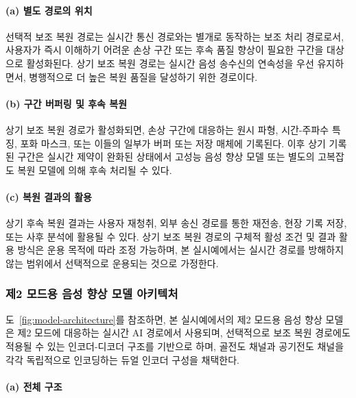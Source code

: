 \documentclass{article}
\DeclareRobustCommand{\codexedit}[1]{\textcolor{customorange}{#1}}
\begin{document}
\paragraph{(a) 별도 경로의 위치}

선택적 보조 복원 경로는 실시간 통신 경로와는 별개로 동작하는 보조 처리 경로로서, 사용자가 즉시 이해하기 어려운 손상 구간 또는 후속 품질 향상이 필요한 구간을 대상으로 활성화된다. 상기 보조 복원 경로는 실시간 음성 송수신의 연속성을 우선 유지하면서, 병행적으로 더 높은 복원 품질을 달성하기 위한 경로이다.

\paragraph{(b) 구간 버퍼링 및 후속 복원}

상기 보조 복원 경로가 활성화되면, 손상 구간에 대응하는 원시 파형, 시간-주파수 특징, 포화 마스크, 또는 이들의 일부가 버퍼 또는 저장 매체에 기록된다. 이후 상기 기록된 구간은 실시간 제약이 완화된 상태에서 고성능 음성 향상 모델 또는 별도의 고복잡도 복원 모델에 의해 후속 처리될 수 있다.

\paragraph{(c) 복원 결과의 활용}

상기 후속 복원 결과는 사용자 재청취, 외부 송신 경로를 통한 재전송, 현장 기록 저장, 또는 사후 분석에 활용될 수 있다. 상기 보조 복원 경로의 구체적 활성 조건 및 결과 활용 방식은 운용 목적에 따라 조정 가능하며, 본 실시예에서는 실시간 경로를 방해하지 않는 범위에서 선택적으로 운용되는 것으로 가정한다.

\subsubsection[제2 모드용 음성 향상 모델 아키텍처]{\textcolor{customorange}{제2 모드용 음성 향상 모델 아키텍처}}

\codexedit{도~\ref{fig:model-architecture}를 참조하면, 본 실시예에서의 제2 모드용 음성 향상 모델은 제2 모드에 대응하는 실시간 AI 경로에서 사용되며, 선택적으로 보조 복원 경로에도 적용될 수 있는 인코더-디코더 구조를 기반으로 하며, 골전도 채널과 공기전도 채널을 각각 독립적으로 인코딩하는 듀얼 인코더 구성을 채택한다.}

\paragraph{(a) 전체 구조}
\end{document}
